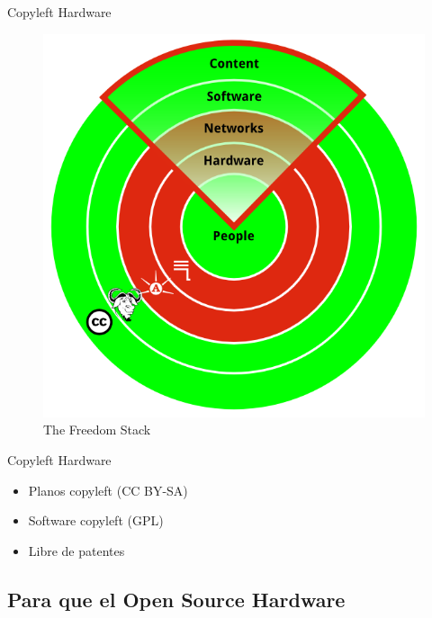 \documentclass{beamer}
\begin{document}
\begin{frame}{Copyleft Hardware}
  \begin{figure}
    \centering
    \includegraphics[scale=0.3]{img/FreedomStackSphere}
    \caption{The Freedom Stack}
    \label{fig:qistack}
  \end{figure}
\end{frame}

\begin{frame}{Copyleft Hardware}
  \begin{itemize}
  \item Planos copyleft (CC BY-SA)
  \item Software copyleft (GPL)
  \item Libre de patentes
  \end{itemize}
\end{frame}

\subsection{Para que el Open Source Hardware}
\end{document}
